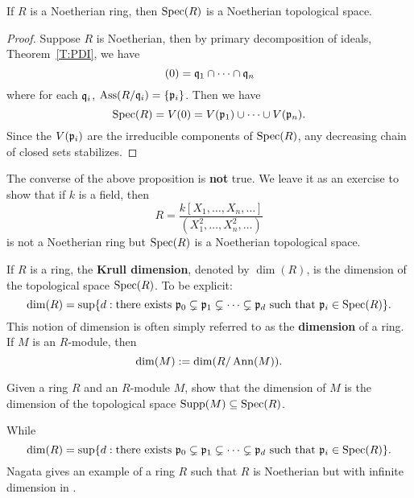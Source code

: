 \documentclass{ximera}
\begin{document}
\begin{proposition}
  If $R$ is a Noetherian ring, then $\operatorname{Spec}(R)$ is a Noetherian
  topological space.
  \begin{proof}
    Suppose $R$ is Noetherian, then by primary decomposition of
    ideals, Theorem~\ref{T:PDI}, we have
    \[
    (0) = \mathfrak{q}_1\cap \dots \cap \mathfrak{q}_n
    \]
    where for each $\mathfrak{q}_i$, $\operatorname{Ass}(R/\mathfrak{q}_i) = \{\mathfrak{p}_i\}$.  Then we have
    \[
    \operatorname{Spec}(R) = V(0) = V(\mathfrak{p}_1) \cup\dots \cup V(\mathfrak{p}_n). 
    \]
    Since the $V(\mathfrak{p}_i)$ are the irreducible components of $\operatorname{Spec}(R)$,
    any decreasing chain of closed sets stabilizes.
  \end{proof}
\end{proposition}



\begin{warning}
  The converse of the above proposition is \textbf{not} true. We leave
  it as an exercise to show that if $k$ is a field, then
  \[
  R = \frac{k[X_1,\dots,X_n,\dots]}{(X_1^2,\dots,X_n^2,\dots)}
  \]
  is not a Noetherian ring but $\operatorname{Spec}(R)$ is a Noetherian topological space.
\end{warning}


\begin{definition}
  If $R$ is a ring, the \textbf{Krull dimension}, denoted by
  $\dim(R)$, is the dimension of the topological space $\operatorname{Spec}(R)$. To
  be explicit:
  \[
  \dim(R) = \sup \{ d : \text{there exists $\mathfrak{p}_0\subsetneq \mathfrak{p}_1
    \subsetneq \dots \subsetneq \mathfrak{p}_d$ such that $\mathfrak{p}_i \in \operatorname{Spec}(R)$} \}.
  \]
  This notion of dimension is often simply referred to as the
  \textbf{dimension} of a ring. If $M$ is an $R$-module, then
  \[
  \dim(M) := \dim(R/\operatorname{Ann}(M)).
  \]
\end{definition}


\begin{exercise}
  Given a ring $R$ and an $R$-module $M$, show that the dimension of
  $M$ is the dimension of the topological space $\operatorname{Supp}(M)\subseteq
  \operatorname{Spec}(R)$.
\end{exercise}

\begin{example}
  While
  \[
  \dim(R) = \sup \{ d : \text{there exists $\mathfrak{p}_0\subsetneq \mathfrak{p}_1 \subsetneq \dots \subsetneq \mathfrak{p}_d$ such that $\mathfrak{p}_i \in \operatorname{Spec}(R)$} \}.
  \]
  Nagata gives an example of a ring $R$ such that $R$ is Noetherian
  but with infinite dimension in \cite{mN1962}.
\end{example}
\end{document}
